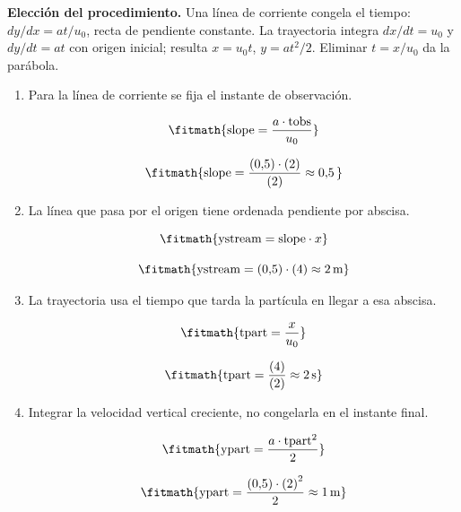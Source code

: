 \noindent\textbf{Elección del procedimiento.} Una línea de corriente congela el tiempo: $dy/dx=at/u_0$, recta de pendiente constante. La trayectoria integra $dx/dt=u_0$ y $dy/dt=at$ con origen inicial; resulta $x=u_0t$, $y=at^2/2$. Eliminar $t=x/u_0$ da la parábola.

\begin{enumerate}

\item Para la línea de corriente se fija el instante de observación.

\[\fitmath{\mathrm{slope}=\frac{a\cdot \mathrm{tobs}}{u_{0}}}\]

\[\fitmath{\mathrm{slope}=\frac{(0{,}5)\cdot (2)}{(2)}\approx 0{,}5\,}\]

\item La línea que pasa por el origen tiene ordenada pendiente por abscisa.

\[\fitmath{\mathrm{ystream}=\mathrm{slope}\cdot x}\]

\[\fitmath{\mathrm{ystream}=(0{,}5)\cdot (4)\approx 2\,\mathrm{m}}\]

\item La trayectoria usa el tiempo que tarda la partícula en llegar a esa abscisa.

\[\fitmath{\mathrm{tpart}=\frac{x}{u_{0}}}\]

\[\fitmath{\mathrm{tpart}=\frac{(4)}{(2)}\approx 2\,\mathrm{s}}\]

\item Integrar la velocidad vertical creciente, no congelarla en el instante final.

\[\fitmath{\mathrm{ypart}=\frac{a\cdot {\mathrm{tpart}}^{2}}{2}}\]

\[\fitmath{\mathrm{ypart}=\frac{(0{,}5)\cdot {(2)}^{2}}{2}\approx 1\,\mathrm{m}}\]

\end{enumerate}
